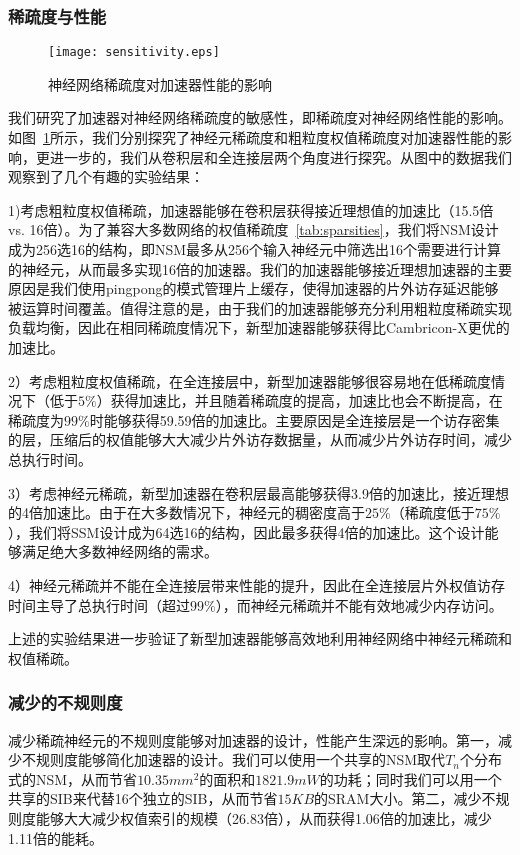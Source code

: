 \subsubsection{稀疏度与性能}
\begin{figure}[h]
\centering
\texttt{[image: sensitivity.eps]}
\caption{神经网络稀疏度对加速器性能的影响}
\label{fig:sensitivity}
\end{figure}

我们研究了加速器对神经网络稀疏度的敏感性，即稀疏度对神经网络性能的影响。如图~\ref{fig:sensitivity}所示，我们分别探究了神经元稀疏度和粗粒度权值稀疏度对加速器性能的影响，更进一步的，我们从卷积层和全连接层两个角度进行探究。从图中的数据我们观察到了几个有趣的实验结果：

1)考虑粗粒度权值稀疏，加速器能够在卷积层获得接近理想值的加速比（15.5倍 vs. 16倍）。为了兼容大多数网络的权值稀疏度~\ref{tab:sparsities}，我们将NSM设计成为256选16的结构，即NSM最多从256个输入神经元中筛选出16个需要进行计算的神经元，从而最多实现16倍的加速器。我们的加速器能够接近理想加速器的主要原因是我们使用pingpong的模式管理片上缓存，使得加速器的片外访存延迟能够被运算时间覆盖。值得注意的是，由于我们的加速器能够充分利用粗粒度稀疏实现负载均衡，因此在相同稀疏度情况下，新型加速器能够获得比Cambricon-X更优的加速比。

2）考虑粗粒度权值稀疏，在全连接层中，新型加速器能够很容易地在低稀疏度情况下（低于$5\%$）获得加速比，并且随着稀疏度的提高，加速比也会不断提高，在稀疏度为$99\%$时能够获得59.59倍的加速比。主要原因是全连接层是一个访存密集的层，压缩后的权值能够大大减少片外访存数据量，从而减少片外访存时间，减少总执行时间。

3）考虑神经元稀疏，新型加速器在卷积层最高能够获得3.9倍的加速比，接近理想的4倍加速比。由于在大多数情况下，神经元的稠密度高于$25\%$（稀疏度低于$75\%$），我们将SSM设计成为64选16的结构，因此最多获得4倍的加速比。这个设计能够满足绝大多数神经网络的需求。

4）神经元稀疏并不能在全连接层带来性能的提升，因此在全连接层片外权值访存时间主导了总执行时间（超过$99\%$），而神经元稀疏并不能有效地减少内存访问。

上述的实验结果进一步验证了新型加速器能够高效地利用神经网络中神经元稀疏和权值稀疏。

\subsubsection{减少的不规则度}
减少稀疏神经元的不规则度能够对加速器的设计，性能产生深远的影响。第一，减少不规则度能够简化加速器的设计。我们可以使用一个共享的NSM取代$T_n$个分布式的NSM，从而节省$10.35mm^2$的面积和$1821.9mW$的功耗；同时我们可以用一个共享的SIB来代替16个独立的SIB，从而节省$15KB$的SRAM大小。第二，减少不规则度能够大大减少权值索引的规模（26.83倍），从而获得1.06倍的加速比，减少1.11倍的能耗。

